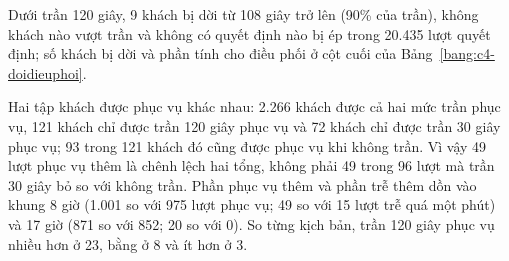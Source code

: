 Dưới trần 120 giây, 9 khách bị dời từ 108 giây trở lên (90\% của trần), không khách nào vượt trần và không có quyết
định nào bị ép trong 20.435 lượt quyết định; số khách bị dời và phần tính cho điều phối ở cột cuối của
Bảng~\ref{bang:c4-doidieuphoi}.

Hai tập khách được phục vụ khác nhau: 2.266 khách được cả hai mức trần phục vụ, 121 khách chỉ được trần 120 giây phục
vụ và 72 khách chỉ được trần 30 giây phục vụ; 93 trong 121 khách đó cũng được phục vụ khi không trần. Vì vậy 49 lượt
phục vụ thêm là chênh lệch hai tổng, không phải 49 trong 96 lượt mà trần 30 giây bỏ so với không trần. Phần phục vụ
thêm và phần trễ thêm dồn vào khung 8 giờ (1.001 so với 975 lượt phục vụ; 49 so với 15 lượt trễ quá một phút) và 17
giờ (871 so với 852; 20 so với 0). So từng kịch bản, trần 120 giây phục vụ nhiều hơn ở 23, bằng ở 8 và ít hơn ở 3.

